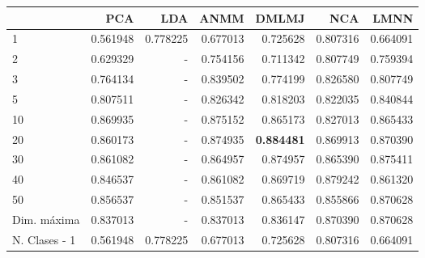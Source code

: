 \begin{tabular}{lrrrrrr}
\toprule
{} &       PCA &       LDA &      ANMM &     DMLMJ &       NCA &      LMNN \\
\midrule
1             &  0.561948 &  0.778225 &  0.677013 &  0.725628 &  0.807316 &  0.664091 \\
2             &  0.629329 &  -        &  0.754156 &  0.711342 &  0.807749 &  0.759394 \\
3             &  0.764134 &  -        &  0.839502 &  0.774199 &  0.826580 &  0.807749 \\
5             &  0.807511 &  -        &  0.826342 &  0.818203 &  0.822035 &  0.840844 \\
10            &  0.869935 &  -        &  0.875152 &  0.865173 &  0.827013 &  0.865433 \\
20            &  0.860173 &  -        &  0.874935 &  \textbf{0.884481} &  0.869913 &  0.870390 \\
30            &  0.861082 &  -        &  0.864957 &  0.874957 &  0.865390 &  0.875411 \\
40            &  0.846537 &  -        &  0.861082 &  0.869719 &  0.879242 &  0.861320 \\
50            &  0.856537 &  -        &  0.851537 &  0.865433 &  0.855866 &  0.870628 \\
Dim. máxima   &  0.837013 &  -        &  0.837013 &  0.836147 &  0.870390 &  0.870628 \\
N. Clases - 1 &  0.561948 &  0.778225 &  0.677013 &  0.725628 &  0.807316 &  0.664091 \\
\bottomrule
\end{tabular}
